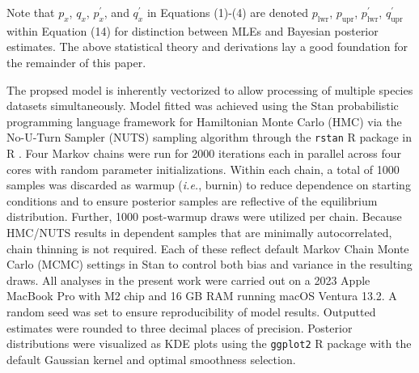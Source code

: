 \documentclass[12pt]{article}
\begin{document}
\noindent Note that $p_x$, $q_x$, $p^{'}_x$, and $q^{'}_x$ in Equations (1)-(4) are denoted $p_\mathrm{lwr}$, $p_\mathrm{upr}$, $p^{'}_\mathrm{lwr}$, $q^{'}_\mathrm{upr}$ within Equation (14) for distinction between MLEs and Bayesian posterior estimates. The above statistical theory and derivations lay a good foundation for the remainder of this paper.

The propsed model is inherently vectorized to allow processing of multiple species datasets simultaneously. Model fitted was achieved using the Stan probabilistic programming language \citep{carpenter2017stan} framework for Hamiltonian Monte Carlo (HMC) via the No-U-Turn Sampler (NUTS) sampling algorithm \citep{hoffman2014no} through the {\tt rstan} R package \citep{stan2023rstan} in R \citep{rcore2024language}. Four Markov chains were run for 2000 iterations each in parallel across four cores with random parameter initializations. Within each chain, a total of 1000 samples was discarded as warmup (\textit{i.e.}, burnin) to reduce dependence on starting conditions and to ensure posterior samples are reflective of the equilibrium distribution. Further, 1000 post-warmup draws were utilized per chain. Because HMC/NUTS results in dependent samples that are minimally autocorrelated, chain thinning is not required. Each of these reflect default Markov Chain Monte Carlo (MCMC) settings in Stan to control both bias and variance in the resulting draws. All analyses in the present work were carried out on a 2023 Apple MacBook Pro with M2 chip and 16 GB RAM running macOS Ventura 13.2. A random seed was set to ensure reproducibility of model results. Outputted estimates were rounded to three decimal places of precision. Posterior distributions were visualized as KDE plots using the {\tt ggplot2} R package \citep{wickham2016ggplot2} with the default Gaussian kernel and optimal smoothness selection.
\end{document}
